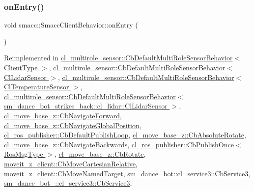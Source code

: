 \subsubsection{\texorpdfstring{on\+Entry()}{onEntry()}}
{\footnotesize\ttfamily void smacc\+::\+Smacc\+Client\+Behavior\+::on\+Entry (\begin{DoxyParamCaption}{ }\end{DoxyParamCaption})\hspace{0.3cm}{\ttfamily [virtual]}}



Reimplemented in \hyperlink{classcl__multirole__sensor_1_1CbDefaultMultiRoleSensorBehavior_a5ac29f93cc91e23715f51ade94467cae}{cl\+\_\+multirole\+\_\+sensor\+::\+Cb\+Default\+Multi\+Role\+Sensor\+Behavior$<$ Client\+Type $>$}, \hyperlink{classcl__multirole__sensor_1_1CbDefaultMultiRoleSensorBehavior_a5ac29f93cc91e23715f51ade94467cae}{cl\+\_\+multirole\+\_\+sensor\+::\+Cb\+Default\+Multi\+Role\+Sensor\+Behavior$<$ Cl\+Lidar\+Sensor $>$}, \hyperlink{classcl__multirole__sensor_1_1CbDefaultMultiRoleSensorBehavior_a5ac29f93cc91e23715f51ade94467cae}{cl\+\_\+multirole\+\_\+sensor\+::\+Cb\+Default\+Multi\+Role\+Sensor\+Behavior$<$ Cl\+Temperature\+Sensor $>$}, \hyperlink{classcl__multirole__sensor_1_1CbDefaultMultiRoleSensorBehavior_a5ac29f93cc91e23715f51ade94467cae}{cl\+\_\+multirole\+\_\+sensor\+::\+Cb\+Default\+Multi\+Role\+Sensor\+Behavior$<$ sm\+\_\+dance\+\_\+bot\+\_\+strikes\+\_\+back\+::cl\+\_\+lidar\+::\+Cl\+Lidar\+Sensor $>$}, \hyperlink{classcl__move__base__z_1_1CbNavigateForward_af9a2e49071de287922c3f5963a079b95}{cl\+\_\+move\+\_\+base\+\_\+z\+::\+Cb\+Navigate\+Forward}, \hyperlink{classcl__move__base__z_1_1CbNavigateGlobalPosition_a66d8b0555ef2945bc108dcd5171be292}{cl\+\_\+move\+\_\+base\+\_\+z\+::\+Cb\+Navigate\+Global\+Position}, \hyperlink{classcl__ros__publisher_1_1CbDefaultPublishLoop_a6e6cfb477cbefc510ca7b55a061545e4}{cl\+\_\+ros\+\_\+publisher\+::\+Cb\+Default\+Publish\+Loop}, \hyperlink{classcl__move__base__z_1_1CbAbsoluteRotate_a10418ea360809fa649d295716b152b2b}{cl\+\_\+move\+\_\+base\+\_\+z\+::\+Cb\+Absolute\+Rotate}, \hyperlink{classcl__move__base__z_1_1CbNavigateBackwards_a545a5282f0ef6b0080b46002d6037567}{cl\+\_\+move\+\_\+base\+\_\+z\+::\+Cb\+Navigate\+Backwards}, \hyperlink{classcl__ros__publisher_1_1CbPublishOnce_afaed71bc2694ec1837278d5f931a76e1}{cl\+\_\+ros\+\_\+publisher\+::\+Cb\+Publish\+Once$<$ Ros\+Msg\+Type $>$}, \hyperlink{classcl__move__base__z_1_1CbRotate_a316ee51ecfd3f10fd1edae0d7d3b26c0}{cl\+\_\+move\+\_\+base\+\_\+z\+::\+Cb\+Rotate}, \hyperlink{classmoveit__z__client_1_1CbMoveCartesianRelative_aaea0e6c7431f93301a77269b8fa539f8}{moveit\+\_\+z\+\_\+client\+::\+Cb\+Move\+Cartesian\+Relative}, \hyperlink{classmoveit__z__client_1_1CbMoveNamedTarget_ad84bcf4ea514c0cdc3550ca41ff77d69}{moveit\+\_\+z\+\_\+client\+::\+Cb\+Move\+Named\+Target}, \hyperlink{classsm__dance__bot_1_1cl__service3_1_1CbService3_ae9e3796b507ad96cc0890fec0f64a4b7}{sm\+\_\+dance\+\_\+bot\+::cl\+\_\+service3\+::\+Cb\+Service3}, \hyperlink{classsm__dance__bot__2_1_1cl__service3_1_1CbService3_a179e43cc240f53f9c49c67094e41d75f}{sm\+\_\+dance\+\_\+bot\+\_\+::cl\+\_\+service3\+::\+Cb\+Service3}, 